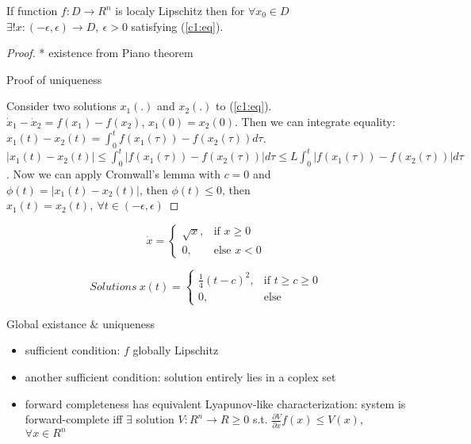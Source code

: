 \begin{Theorem}
If function $f:D \rightarrow R^n$ is localy Lipschitz then for $\forall x_0 \in D$
\ $\exists ! x:(-\epsilon, \epsilon) \rightarrow D, \ \epsilon > 0$
satisfying (\ref{c1:eq}).

\begin{proof}

* existence from Piano theorem

Proof of uniqueness

Consider two solutions $x_1(.)$ and $x_2(.)$ to (\ref{c1:eq}). $\dot x_1-\dot x_2=f(x_1)-f(x_2)$,
$x_1(0)=x_2(0)$. Then we can integrate equality: 
$x_1(t)-x_2(t)=\int^t_0 f(x_1(\tau))-f(x_2(\tau)) d\tau$.  
$|x_1(t)-x_2(t)| \le \int^t_0 |f(x_1(\tau))-f(x_2(\tau))| d\tau \le 
L \int^t_0 |f(x_1(\tau))-f(x_2(\tau))| d\tau$. Now we can apply Cromwall's lemma with $c=0$
and $\phi(t)=|x_1(t)-x_2(t)|$, then $\phi(t)\le 0$, then $x_1(t)=x_2(t), \ \forall t 
\in (-\epsilon,\epsilon)$
\end{proof}
\end{Theorem}

\begin{Example}
\begin{equation*}
    \dot x = 
    \begin{cases}
      \sqrt{x}, & \mbox{if } x \ge 0 \\
      0, & \mbox{else } x<0 
    \end{cases}
\end{equation*}

\begin{equation*}
    Solutions\ x(t) =
    \begin{cases}
      \frac{1}{4}(t-c)^2, & \mbox{if } t \ge c \ge 0 \\
      0, &\mbox {else} 
    \end{cases}
\end{equation*}
\end{Example}

Global existance $\&$ uniqueness
\begin{itemize}
 \item sufficient condition: $f$ globally Lipschitz
 \item another sufficient condition: solution entirely lies in a coplex set
 \item forward completeness has equivalent Lyapunov-like characterization: system is
      forward-complete iff $\exists$ solution $V:R^n \rightarrow R \ge 0$ s.t.
      $\frac{\partial V}{\partial x} f(x) \le V(x)$, $\forall x \in R^n$
\end{itemize}



